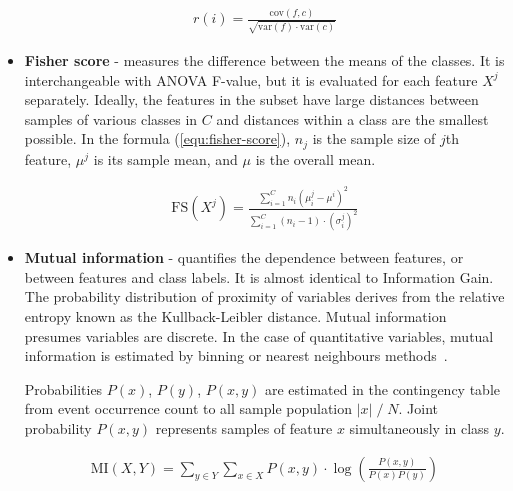 \begin{itemize}
\begin{ceqn}\begin{align}
r(i) = \frac{\mathrm{cov}(f, c)}{\sqrt{\mathrm{var}(f) \cdot \mathrm{var}(c)}}
\end{align}\end{ceqn}


\item \textbf{Fisher score} - measures the difference between the means of the classes. It is interchangeable with ANOVA F-value, but it is evaluated for each feature $X^j$ separately. Ideally, the features in the subset have large distances between samples of various classes in $C$ and distances within a class are the smallest possible. In the formula (\ref{equ:fisher-score}), $n_j$ is the sample size of $j$th feature, $\mu^j$ is its sample mean, and $\mu$ is the overall mean.

\begin{ceqn}\begin{align}
\mathrm{FS}(X^j) = \frac{\sum_{i=1}^{C} n_i(\mu_i^j - \mu^i)^2}{\sum_{i=1}^{C} (n_i - 1) \cdot (\sigma_i^j)^2}
\label{equ:fisher-score}
\end{align}\end{ceqn}

\item \textbf{Mutual information} - quantifies the dependence between features, or between features and class labels. It is almost identical to Information Gain. The probability distribution of proximity of variables derives from the relative entropy known as the Kullback-Leibler distance. Mutual information presumes variables are discrete. In the case of quantitative variables, mutual information is estimated by binning or nearest neighbours methods~\cite{ross_mutual_2014}.

Probabilities $P(x)$, $P(y)$, $P(x, y)$ are estimated in the contingency table from event occurrence count to all sample population $|x|\;/\;N$. Joint probability $P(x, y)$ represents samples of feature $x$ simultaneously in class $y$.

\begin{ceqn}\begin{align}
\mathrm{MI}(X, Y) = \sum_{y \in Y} \sum_{x \in X} P(x, y) \cdot \log\left(\frac{P(x, y)}{P(x)P(y)}\right)
\end{align}\end{ceqn}
\end{itemize}

